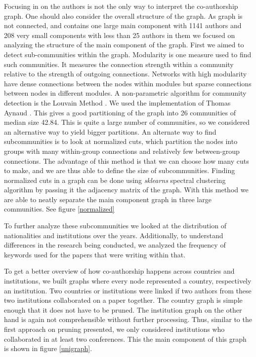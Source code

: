 \documentclass[article,twocolumn]{IEEEtran}
\begin{document}
    Focusing in on the authors is not the only way to interpret the
co-authorship graph. One should also consider the overall structure of
the graph. As graph is not connected, and contains one large main
component with 1141 authors and 208 very small components with less than
25 authors in them we focused on analyzing the structure of the main
component of the graph. First we aimed to detect sub-communities within
the graph. Modularity is one measure used to find such communities. It
measures the connection strength within a community relative to the
strength of outgoing connections. Networks with high modularity have
dense connections between the nodes within modules but sparse
connections between nodes in different modules. A non-parametric
algorithm for community detection is the Louvain Method
\cite{blondel2008fast}. We used the implementation of Thomas Aynaud
\cite{louvain}. This gives a good partitioning of the graph into 26
communities of median size 42.84. This is quite a large number of
communities, so we considered an alternative way to yield bigger
partitions. An alternate way to find subcommunities is to look at
normalized cuts, which partition the nodes into groups with many
within-group connections and relatively few between-group connections.
The advantage of this method is that we can choose how many cuts to
make, and we are thus able to define the size of subcommunities. Finding
normalized cuts in a graph can be done using \emph{sklearns} spectral
clustering algorithm by passing it the adjacency matrix of the graph.
With this method we are able to neatly separate the main component graph
in three large communities. See figure \ref{normalized}

    To further analyze these subcommunities we looked at the distribution of
nationalities and institutions over the years. Additionally, to
understand differences in the research being conducted, we analyzed the
frequency of keywords used for the papers that were writing within that.

To get a better overview of how co-authorship happens across countries
and institutions, we built graphs where every node represented a
country, respectively an institution. Two countries or institutions were
linked if two authors from these two institutions collaborated on a
paper together. The country graph is simple enough that it does not have
to be pruned. The institution graph on the other hand is again not
comprehensible without further processing. Thus, similar to the first
approach on pruning presented, we only considered institutions who
collaborated in at least two conferences. This the main component of
this graph is shown in figure \ref{unigraph}.
\end{document}
